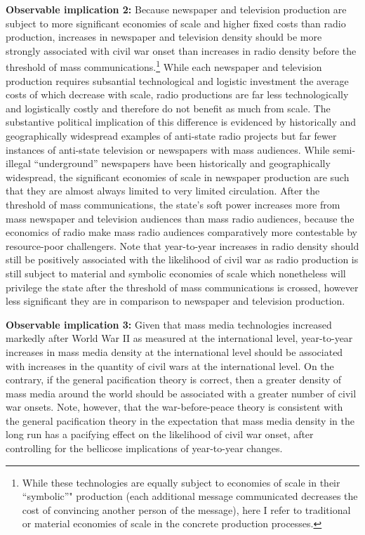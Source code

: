 \documentclass[11pt,article,oneside]{memoir}
\begin{document}
\textbf{Observable implication 2:} Because newspaper and television
production are subject to more significant economies of scale and higher
fixed costs than radio production, increases in newspaper and television
density should be more strongly associated with civil war onset than
increases in radio density before the threshold of mass
communications.\footnote{While these technologies are equally subject to
  economies of scale in their ``symbolic''" production (each additional
  message communicated decreases the cost of convincing another person
  of the message), here I refer to traditional or material economies of
  scale in the concrete production processes.} While each newspaper and
television production requires subsantial technological and logistic
investment the average costs of which decrease with scale, radio
productions are far less technologically and logistically costly and
therefore do not benefit as much from scale. The substantive political
implication of this difference is evidenced by historically and
geographically widespread examples of anti-state radio projects but far
fewer instances of anti-state television or newspapers with mass
audiences. While semi-illegal ``underground'' newspapers have been
historically and geographically widespread, the significant economies of
scale in newspaper production are such that they are almost always
limited to very limited circulation. After the threshold of mass
communications, the state's soft power increases more from mass
newspaper and television audiences than mass radio audiences, because
the economics of radio make mass radio audiences comparatively more
contestable by resource-poor challengers. Note that year-to-year
increases in radio density should still be positively associated with
the likelihood of civil war as radio production is still subject to
material and symbolic economies of scale which nonetheless will
privilege the state after the threshold of mass communications is
crossed, however less significant they are in comparison to newspaper
and television production.

\textbf{Observable implication 3:} Given that mass media technologies
increased markedly after World War II as measured at the international
level, year-to-year increases in mass media density at the international
level should be associated with increases in the quantity of civil wars
at the international level. On the contrary, if the general pacification
theory is correct, then a greater density of mass media around the world
should be associated with a greater number of civil war onsets. Note,
however, that the war-before-peace theory is consistent with the general
pacification theory in the expectation that mass media density in the
long run has a pacifying effect on the likelihood of civil war onset,
after controlling for the bellicose implications of year-to-year
changes.
\end{document}
